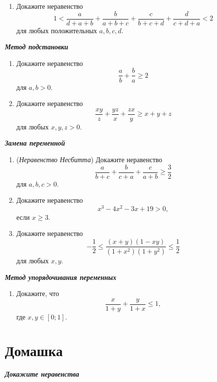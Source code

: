 \documentclass[a4paper,12pt,leqno]{article}
\theoremstyle{plain} %
\theoremstyle{definition} %
\theoremstyle{remark} %
\begin{document}
	\begin{enumerate}
		\item[\z] Докажите неравенство $$1 < \frac{a}{d + a + b} + \frac{b}{a + b + c} +\frac{c}{b+c+d} + \frac{d}{c+d+a} < 2$$
		для любых положительных $a, b, c, d$.
	\end{enumerate}
	
	\textbf{\textit{Метод подстановки}}
	
	\begin{enumerate}
		\item[\z] Докажите неравенство $$\frac{a}{b} + \frac{b}{a} \geqslant 2$$ для $a, b > 0.$
		
		\item[\z] Докажите неравенство $$\frac{xy}{z} + \frac{yz}{x} + \frac{zx}{y} \geqslant x + y + z$$ для любых $x, y, z > 0$.
	\end{enumerate}
	
	\textbf{\textit{Замена переменной}}
	
	\begin{enumerate}
		\item[\z] (\textit{Неравенство Несбитта}) Докажите неравенство $$\frac{a}{b+c} + \frac{b}{c+a} + \frac{c}{a+b} \geqslant \frac{3}{2}$$
		для $a, b, c > 0$.
		
		\item[\z] Докажите неравенство $$x^3 -4x^2-3x+19 > 0 ,$$
		если $x \geqslant 3$.
		
		\item[\z] Докажите неравенство $$-\frac{1}{2} \leqslant \frac{(x+y)(1-xy)}{(1+x^2)(1+y^2)}\leqslant \frac{1}{2}$$
		для любых $x, y$.
	\end{enumerate}
	\newpage
	\textbf{\textit{Метод упорядочивания переменных}}
	
	\begin{enumerate}
		\item[\z] Докажите, что $$\frac{x}{1+y} + \frac{y}{1+x} \leqslant 1 ,$$ где $x, y \in [0; 1].$ 
	\end{enumerate}
	
	\section*{Домашка}
	\textbf{\textit{Докажите неравенства}}
	
	\newcommand{\ner}[1]{\item[\z] #1}
	
\end{document}
